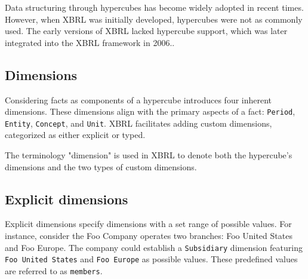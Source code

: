 



Data structuring through hypercubes has become widely adopted in recent times.
However, when XBRL was initially developed, hypercubes were not as commonly used.
The early versions of XBRL lacked hypercube support,
which was later integrated into the XBRL framework in 2006.\cite{xbrl_dimensions}.

\subsection{Dimensions}

Considering facts as components of a hypercube introduces four inherent dimensions.
These dimensions align with the primary aspects of a fact: \texttt{Period}, \texttt{Entity}, \texttt{Concept}, and \texttt{Unit}.
XBRL facilitates adding custom dimensions, categorized as either explicit or typed.

The terminology "dimension" is used in XBRL to denote both the hypercube's dimensions and the two types of custom dimensions.

\subsection{Explicit dimensions}

Explicit dimensions specify dimensions with a set range of possible values.
For instance, consider the Foo Company operates two branches: Foo United States and Foo Europe.
The company could establish a \texttt{Subsidiary} dimension featuring \texttt{Foo United States} and \texttt{Foo Europe} as possible values.
These predefined values are referred to as \texttt{members}.

